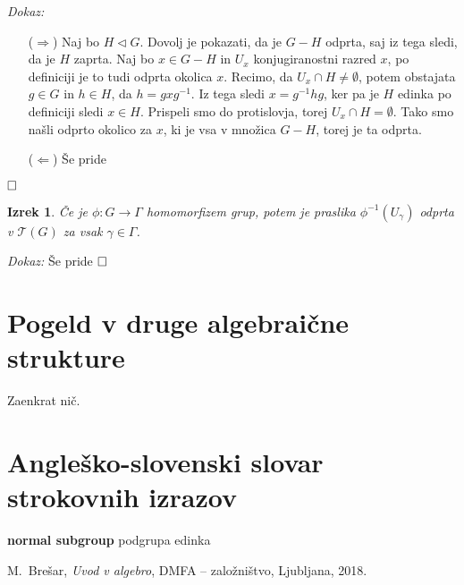 \documentclass[a4paper,12pt]{article}
\newcommand{\geslo}[2]{\noindent\textbf{#1} {#2}}
\def\qed{$\hfill\Box$}   %
\newtheorem{izrek}{Izrek}
\begin{document}
\noindent
{\em Dokaz:\/}
    \begin{itemize}
        \item[($\Rightarrow$)] Naj bo $H \triangleleft G$. Dovolj je pokazati, da je $G - H$ odprta, saj iz tega sledi, da je $H$ zaprta.
        Naj bo $x \in G - H$ in $U_x$ konjugiranostni razred $x$, po definiciji je to tudi odprta okolica $x$.
        Recimo, da $U_x \cap H \neq \emptyset$, potem obstajata $g \in G$ in $h \in H$, da $h = gxg^{-1}$.
        Iz tega sledi $x = g^{-1}hg$, ker pa je $H$ edinka po definiciji sledi $x \in H$. Prispeli smo do protislovja, torej $U_x \cap H = \emptyset$.
        Tako smo našli odprto okolico za $x$, ki je vsa v množica $G - H$, torej je ta odprta.
        \item[($\Leftarrow$)] Še pride
    \end{itemize} 
\qed

\begin{izrek}
    Če je $\phi: G \rightarrow \Gamma$ homomorfizem grup, potem je praslika $\phi^{-1}(U_\gamma)$ odprta v $\mathcal{T}(G)$ za vsak $\gamma \in \Gamma$.
\end{izrek}

\noindent
{\em Dokaz:\/}
    Še pride
\qed

\section{Pogeld v druge algebraične strukture}

Zaenkrat nič.


\section*{Angleško-slovenski slovar strokovnih izrazov}

\geslo{normal subgroup}{podgrupa edinka}

\begin{thebibliography}{1}
    M.~Brešar, \emph{Uvod v algebro}, DMFA -- založništvo, Ljubljana, 2018.
\end{thebibliography}
    
\end{document}
